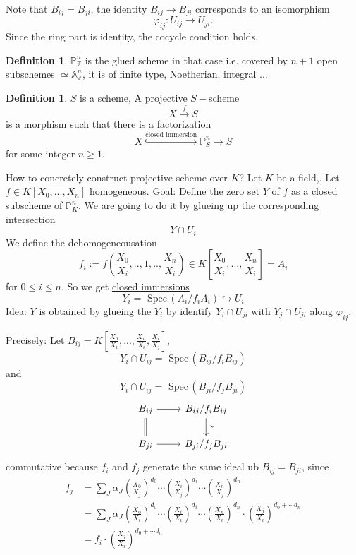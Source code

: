 \documentclass[11pt]{article}
\theoremstyle{definition}
\newtheorem{dfn}[thm]{Definition}
\newcommand{\spec}{\text{ Spec}\,}
\newcommand{\affn}{\mathbb A}
\newcommand{\proj}{\mathbb P}
\newcommand{\intg}{\mathbb Z}
\newcommand{\lrta}{\longrightarrow}
\newcommand{\inj}{\hookrightarrow}
\begin{document}
Note that $B_{ij}=B_{ji}$, the identity $B_{ij}\lrta B_{ji}$ corresponds to an isomorphism 
$$
\varphi_{ij}:U_{ij}\lrta U_{ji}.
$$
Since the ring part is identity, the cocycle condition holds.
\begin{dfn}
$\proj^n_\intg$ is the glued scheme in that case
i.e. covered by $n+1$ open subschemes $\simeq \affn^n_\intg$, it is of finite type, Noetherian, integral ...
\end{dfn}
\begin{dfn}
$S$ is a  scheme, A projective $S-$scheme
$$
X\overset{f}{\lrta} S
$$
is a morphism such that there is a factorization
$$
X\overset{\text{closed immersion}}\inj \proj^n_S\lrta S
$$
for some integer $n\geq 1$.
\end{dfn}

How to concretely construct projective scheme over $K$? Let $K$ be a field,. Let $f\in K[X_0,...,X_n]$ homogeneous. \underline{Goal}: Define the zero set $Y$ of $f$ as a  closed subscheme of $\proj^n_K$. We are going to do it by glueing up the corresponding intersection
$$
Y\cap U_i
$$
We define the dehomogeneousation 
$$
f_i:=f\left(\frac{X_0}{X_i},..,1,..,\frac{X_n}{X_i}\right)\in K[\frac{X_0}{X_i},...,\frac{X_n}{X_i}]=A_i
$$
for $0\leq i\leq n$.
So we get \underline{closed immersions}
$$
Y_i=\spec(A_i/f_i A_i)\inj U_i
$$
Idea: $Y$ is obtained by glueing the $Y_i$ by identify $Y_i\cap U_{ji}$ with $Y_j\cap U_{ji}$ along $\varphi_{ij}$.

Precisely: Let $B_{ij}=K[\frac{X_0}{X_i},...,\frac{X_n}{X_i},\frac{X_i}{X_j}]$,
$$
Y_i\cap U_{ij}=\spec(B_{ij}/f_i B_{ij})
$$
and
$$
Y_i\cap U_{ij}=\spec(B_{ji}/f_j B_{ji})
$$
$$
\begin{tikzcd}
B_{ij} \arrow[r] \arrow[d, equal] & B_{ij}/f_iB_{ij} \arrow[d, "\sim"] \\
B_{ji} \arrow[r] & B_{ji}/f_jB_{ji}
\end{tikzcd}
$$
commutative because $f_i$ and $f_j$ generate the same ideal ub $B_{ij}=B_{ji}$, since
$$
\begin{aligned}
f_j &=\sum_J \alpha_J \left(\frac{X_0}{X_j}\right)^{d_0}\cdots\left(\frac{X_i}{X_j}\right)^{d_i}\cdots \left(\frac{X_n}{X_j}\right)^{d_n}\\
&=\sum_J \alpha_J \left(\frac{X_0}{X_i}\right)^{d_0}\cdots\left(\frac{X_i}{X_i}\right)^{d_i}\cdots \left(\frac{X_n}{X_i}\right)^{d_n}\cdot \left(\frac{X_j}{X_i}\right)^{d_0+\cdots d_n}\\
&= f_i \cdot \left(\frac{X_j}{X_i}\right)^{d_0+\cdots d_n}
\end{aligned}
$$
\end{document}
